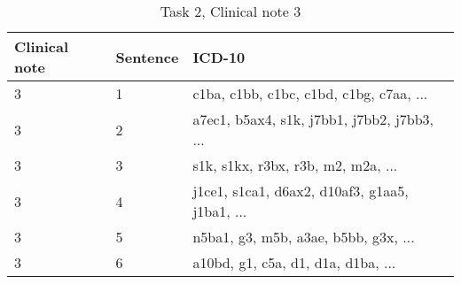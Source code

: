 \begin{table}[!htb] \footnotesize \center
\caption{Task 2, Clinical note 3 \label{tab:t2c3}}
\begin{tabularx}{\textwidth}{l l X}
    \toprule
    Clinical note & Sentence & ICD-10 \\
    \midrule
	 3 & 1 & c1ba, c1bb, c1bc, c1bd, c1bg, c7aa, ... \\
	 3 & 2 & a7ec1, b5ax4, s1k, j7bb1, j7bb2, j7bb3, ... \\
	 3 & 3 & s1k, s1kx, r3bx, r3b, m2, m2a, ... \\
	 3 & 4 & j1ce1, s1ca1, d6ax2, d10af3, g1aa5, j1ba1, ... \\
	 3 & 5 & n5ba1, g3, m5b, a3ae, b5bb, g3x, ... \\
	 3 & 6 & a10bd, g1, c5a, d1, d1a, d1ba, ... \\
	\bottomrule
\end{tabularx}
\end{table}